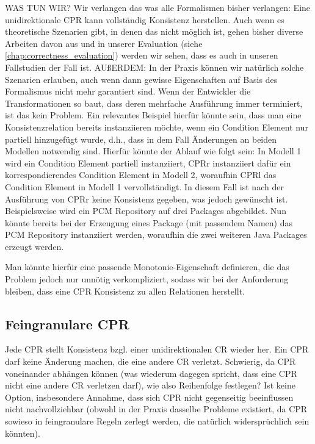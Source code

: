WAS TUN WIR?
Wir verlangen das was alle Formalismen bisher verlangen: Eine unidirektionale CPR kann vollständig Konsistenz herstellen. Auch wenn es theoretische Szenarien gibt, in denen das nicht möglich ist, gehen bisher diverse Arbeiten davon aus und in unserer Evaluation (siehe \autoref{chap:correctness_evaluation}) werden wir sehen, dass es auch in unseren Fallstudien der Fall ist.
AUßERDEM: In der Praxis können wir natürlich solche Szenarien erlauben, auch wenn dann gewisse Eigenschaften auf Basis des Formalismus nicht mehr garantiert sind.
Wenn der Entwickler die Transformationen so baut, dass deren mehrfache Ausführung immer terminiert, ist das kein Problem. Ein relevantes Beispiel hierfür könnte sein, dass man eine Konsistenzrelation bereits instanziieren möchte, wenn ein Condition Element nur partiell hinzugefügt wurde, d.h., dass in dem Fall Änderungen an beiden Modellen notwendig sind.
Hierfür könnte der Ablauf wie folgt sein: In Modell 1 wird ein Condition Element partiell instanziiert, CPRr instanziiert dafür ein korrespondierendes Condition Element in Modell 2, woraufhin CPRl das Condition Element in Modell 1 vervollständigt. In diesem Fall ist nach der Ausführung von CPRr keine Konsistenz gegeben, was jedoch gewünscht ist.
Beispielsweise wird ein PCM Repository auf drei Packages abgebildet. Nun könnte bereits bei der Erzeugung eines Package (mit passendem Namen) das PCM Repository instanziiert werden, woraufhin die zwei weiteren Java Packages erzeugt werden.

Man könnte hierfür eine passende Monotonie-Eigenschaft definieren, die das Problem jedoch nur unnötig verkompliziert, sodass wir bei der Anforderung bleiben, dass eine CPR Konsistenz zu allen Relationen herstellt.







\subsection{Feingranulare CPR}
Jede CPR stellt Konsistenz bzgl. einer unidirektionalen CR wieder her.
Ein CPR darf keine Änderung machen, die eine andere CR verletzt.
Schwierig, da CPR voneinander abhängen können (was wiederum dagegen spricht, dass eine CPR nicht eine andere CR verletzen darf), wie also Reihenfolge festlegen?
Ist keine Option, insbesondere Annahme, dass sich CPR nicht gegenseitig beeinflussen nicht nachvollziehbar (obwohl in der Praxis dasselbe Probleme existiert, da CPR sowieso in feingranulare Regeln zerlegt werden, die natürlich widersprüchlich sein könnten).




